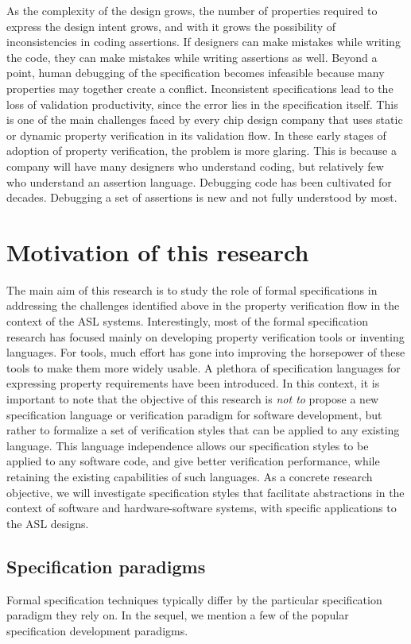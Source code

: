 \noindent
As the complexity of the design grows, the number of properties required to
express the design intent grows, and with it grows the possibility of 
inconsistencies in coding assertions. 
If designers can make mistakes while writing 
the code, they can make mistakes while writing assertions as well. 
Beyond a point, human debugging of the 
specification becomes infeasible because many properties may together 
create a conflict. 
Inconsistent specifications lead to the loss of validation
productivity, since the error lies in the specification itself.
This is one of the main challenges faced by every chip design company that
uses static or dynamic property verification in its validation flow. In
these early stages of adoption of property verification, the problem is more
glaring. This is because a company will have many designers
who understand coding, but relatively few who understand an assertion
language. Debugging code has been cultivated for decades. Debugging
a set of assertions is new and not fully understood by most.

\section{Motivation of this research}
The main aim of this research is to study the role of formal specifications 
in addressing the challenges identified above in the property verification 
flow in the context of the ASL systems. 
Interestingly, most of the formal specification research has focused mainly on 
developing property verification tools or inventing languages. For tools, 
much effort has gone into improving the horsepower of these tools to 
make them more widely usable. A plethora of specification languages for 
expressing property requirements have been introduced. In this context, it 
is important to note that the objective of this research is {\em not to} 
propose a new specification language or verification paradigm for software
development, but rather to formalize a set of verification styles 
that can be applied to any existing language. This language independence 
allows our specification styles to be applied to any software code, 
and give better verification performance, while retaining the 
existing capabilities of such languages. As a concrete research 
objective, we will investigate specification styles that facilitate 
abstractions in the context of software and hardware-software systems, 
with specific applications to the ASL designs.

\subsection {Specification paradigms}
Formal specification techniques typically differ by the particular 
specification paradigm they rely on. In the sequel, we mention a few 
of the popular specification development paradigms. 

